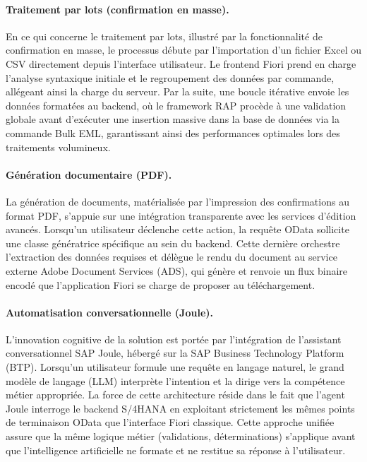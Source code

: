\documentclass[12pt,a4paper,oneside]{report}
\begin{document}
\paragraph{Traitement par lots (confirmation en masse).} En ce qui concerne le traitement par lots, illustré par la fonctionnalité de confirmation en masse, le processus débute par l'importation d'un fichier Excel ou CSV directement depuis l'interface utilisateur. Le frontend Fiori prend en charge l'analyse syntaxique initiale et le regroupement des données par commande, allégeant ainsi la charge du serveur. Par la suite, une boucle itérative envoie les données formatées au backend, où le framework RAP procède à une validation globale avant d'exécuter une insertion massive dans la base de données via la commande Bulk EML, garantissant ainsi des performances optimales lors des traitements volumineux.

\paragraph{Génération documentaire (PDF).} La génération de documents, matérialisée par l'impression des confirmations au format PDF, s'appuie sur une intégration transparente avec les services d'édition avancés. Lorsqu'un utilisateur déclenche cette action, la requête OData sollicite une classe génératrice spécifique au sein du backend. Cette dernière orchestre l'extraction des données requises et délègue le rendu du document au service externe Adobe Document Services (ADS), qui génère et renvoie un flux binaire encodé que l'application Fiori se charge de proposer au téléchargement.

\paragraph{Automatisation conversationnelle (Joule).} L'innovation cognitive de la solution est portée par l'intégration de l'assistant conversationnel SAP Joule, hébergé sur la SAP Business Technology Platform (BTP). Lorsqu'un utilisateur formule une requête en langage naturel, le grand modèle de langage (LLM) interprète l'intention et la dirige vers la compétence métier appropriée. La force de cette architecture réside dans le fait que l'agent Joule interroge le backend S/4HANA en exploitant strictement les mêmes points de terminaison OData que l'interface Fiori classique. Cette approche unifiée assure que la même logique métier (validations, déterminations) s'applique avant que l'intelligence artificielle ne formate et ne restitue sa réponse à l'utilisateur.
\end{document}
